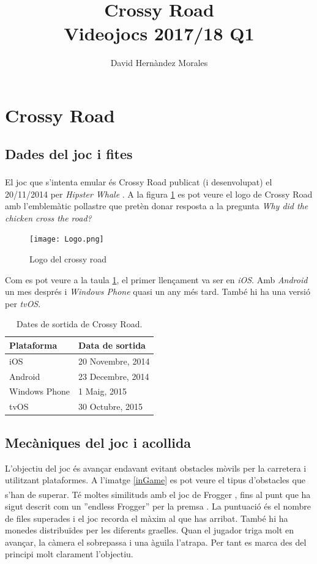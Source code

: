 \documentclass{article}
\title{Crossy Road \\
		\large Videojocs 2017/18 Q1}
\author{David Hernàndez Morales}
\begin{document}
\maketitle
\newpage
{}
\section{Crossy Road}
\subsection{Dades del joc i fites}
El joc que s'intenta emular és Crossy Road \textsuperscript{\texttrademark}
publicat (i desenvolupat) el 20/11/2014 per \textit{Hipster Whale} \cite{webCrossy}
\cite{wikipediaCrossy}. A la figura \ref{logo} es pot veure el logo de Crossy Road
amb l'emblemàtic pollastre que pretèn donar resposta a la pregunta
\textit{Why did the chicken cross the road?} \cite{preguntaChicken}

\begin{figure}[h!]
	\texttt{[image: Logo.png]}
	\caption{Logo del crossy road}
	\label{logo}
\end{figure}

Com es pot veure a la taula \ref{dadesSortida}, el primer llençament va ser en
\textit{iOS}. Amb \textit{Android} un mes després i \textit{Windows Phone}
quasi un any més tard. També hi ha una versió per \textit{tvOS}.

\begin{table}[h!]
	\begin{center}
		\label{dadesSortida}
		\begin{tabular}{l|l}
		\textbf{Plataforma} & \textbf{Data de sortida} \\
		\hline
		iOS & 20 Novembre, 2014 \\
		Android & 23 Decembre, 2014 \\
		Windows Phone & 1 Maig, 2015 \\
		tvOS & 30 Octubre, 2015
		\end{tabular}
		\caption{Dates de sortida de Crossy Road.}
	\end{center}
\end{table}

\subsection{Mecàniques del joc i acollida}

L'objectiu del joc és avançar endavant evitant obstacles mòvils per la
carretera i utilitzant plataformes. A l'imatge \ref{inGame}
es pot veure el tipus d'obstacles que s'han de superar.
Té moltes similituds amb el joc de
Frogger \textsuperscript{\texttrademark}, fins al punt que ha sigut
descrit com un ''endless Frogger'' per la premsa \cite{endlessFrogger1}
\cite{endlessFrogger2}. La puntuació és el nombre de files superades i
el joc recorda el màxim al que has arribat. També hi ha monedes distribuïdes
per les diferents graelles. Quan el jugador triga molt en avançar, la càmera
el sobrepassa i una àguila l'atrapa. Per tant es marca des del principi molt
clarament l'objectiu. \newline
\end{document}

